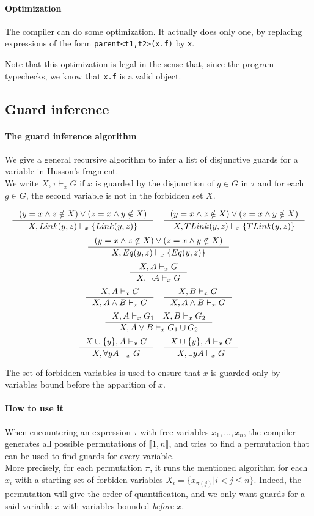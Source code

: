 \documentclass[10pt,a4paper]{article}
\newcommand{\ocaml}{\texttt}
\begin{document}
\paragraph{Optimization}
The compiler can do some optimization. It actually does only one, by replacing expressions of the form
\ocaml{parent<t1,t2>(x.f)} by \ocaml{x}.

Note that this optimization is legal in the sense that, since the program typechecks, we know that \ocaml{x.f} is a valid object.

\subsection{Guard inference}
\label{subsec:guardinfer}

\paragraph{The guard inference algorithm}
We give a general recursive algorithm to infer a list of disjunctive guards for a variable in Husson's fragment.\\
We write $X,\tau \vdash_x G$ if $x$ is guarded by the disjunction of $g\in G$ in $\tau$ and for each $g\in G$, the second variable is not in the forbidden set $X$.

\[\inference{(y=x \land z \notin X) \lor (z=x \land y \notin X)}{X, Link(y,z) \vdash_x \{ Link(y,z) \}}  \quad \inference{(y=x \land z \notin X) \lor (z=x \land y \notin X)}{X, TLink(y,z) \vdash_x \{ TLink(y,z)\}}\]
\[\inference{(y=x \land z \notin X) \lor (z=x \land y \notin X)}{X, Eq(y,z) \vdash_x \{ Eq(y,z) \}}\]
\[\inference{X,A \vdash_x G }{X, \neg A \vdash_x G}\]
\[\inference{X,A \vdash_x G }{X, A\land B \vdash_x G} \quad \inference{X,B \vdash_x G }{X, A\land B \vdash_x G}\]
\[\inference{X,A \vdash_x G_1  \quad X,B \vdash_x G_2}
  {X, A\lor B \vdash_x G_1 \cup G_2}\]
\[\inference{X\cup \{y\},A \vdash_x G }{X, \forall y A \vdash_x G} \quad
\inference{X\cup \{y\},A \vdash_x G }{X, \exists y A \vdash_x G}\]

The set of forbidden variables is used to ensure that $x$ is guarded only by variables bound before the apparition of $x$.

\paragraph{How to use it}
When encountering an expression $\tau$ with free variables $x_1,...,x_n$, the compiler generates all possible permutations of $\llbracket 1,n \rrbracket$, and tries to find a permutation that can be used to find guards for every variable.\\
More precisely, for each permutation $\pi$, it runs the mentioned algorithm for each $x_i$ with a starting set of forbiden variables $X_i = \{x_{\pi(j)} | i<j\le n\}$. Indeed, the permutation will give the order of quantification, and we only want guards for a said variable $x$ with variables bounded \emph{before} $x$.
\end{document}
